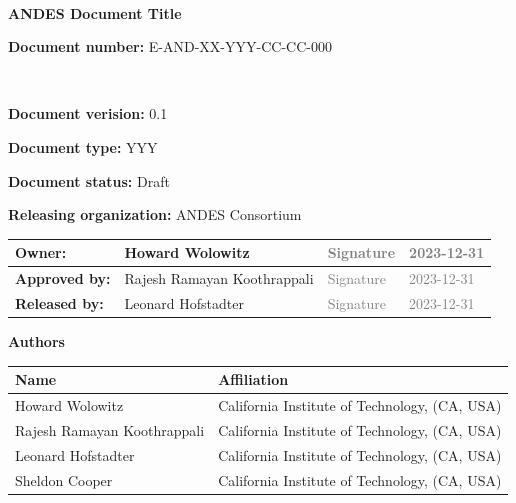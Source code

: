 \documentclass[12pt,a4paper]{article}
\newcommand{\ESOdoctitle}{ANDES Document Title}
\newcommand{\ESOdocnumber}{E-AND-XX-YYY-CC-CC-000}
\newcommand{\ESOdocversion}{0.1}
\newcommand{\ESOdoctype}{YYY}
\newcommand{\ESOdocstatus}{Draft}  %
\newcommand{\ESOdocorganization}{ANDES Consortium}
\begin{document}
\vspace{3cm}

\begin{center}
  \begin{tcolorbox}[colframe=andesbrown, colback=andesgray, width=0.8\textwidth]
    \

    \begin{center}
      {\bf \large \textcolor{andesbrown} \ESOdoctitle{} }
    \end{center}

    \bigskip


    {\bf Document number:} \ESOdocnumber{}

    \

    {\bf Document verision:} \ESOdocversion{}

    {\bf Document type:} \ESOdoctype{}

    {\bf Document status:} \ESOdocstatus{}

    {\bf Releasing organization:} \ESOdocorganization{}
  \end{tcolorbox}
\end{center}

\vfill

\begin{center}
  \begin{tabularx}{\textwidth}{|l|X|l|l|}
    \hline
    {\bf \small Owner:}       &  Howard Wolowitz               & \textcolor{gray}{Signature} & \textcolor{gray}{2023-12-31} \\[0.8cm] \hline
    {\bf \small Approved by:} &  Rajesh Ramayan Koothrappali   & \textcolor{gray}{Signature} & \textcolor{gray}{2023-12-31} \\[0.8cm] \hline
    {\bf \small Released by:} &  Leonard Hofstadter            & \textcolor{gray}{Signature} & \textcolor{gray}{2023-12-31} \\[0.8cm] \hline
    \end{tabularx}
\end{center}


\restoregeometry



\newpage
\pagestyle{fancy}

\noindent
{\Large \bf Authors}
\medskip

\noindent
\begin{tabularx}{\textwidth}{|l|X|}
  \hline
      {\bf Name} & {\bf Affiliation}\\
      \hline
      Howard Wolowitz                 & California Institute of Technology, (CA, USA)\\
      Rajesh Ramayan Koothrappali     & California Institute of Technology, (CA, USA)\\
      Leonard Hofstadter              & California Institute of Technology, (CA, USA)\\
      Sheldon Cooper                  & California Institute of Technology, (CA, USA)\\
      \hline
\end{tabularx}
\end{document}

